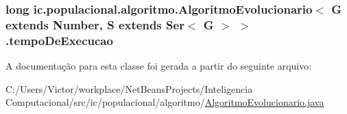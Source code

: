 \hypertarget{classic_1_1populacional_1_1algoritmo_1_1_algoritmo_evolucionario_3_01_g_01extends_01_number_00_0bd52af860edf752f8985460efb0aa102_a8879c2e45d6694781b6b7f8378efaf39}{
\subsubsection[{tempo\-De\-Execucao}]{\setlength{\rightskip}{0pt plus 5cm}long ic.\-populacional.\-algoritmo.\-Algoritmo\-Evolucionario$<$ G extends Number, S extends Ser$<$ G $>$ $>$.tempo\-De\-Execucao\hspace{0.3cm}{\ttfamily [protected]}}}\label{classic_1_1populacional_1_1algoritmo_1_1_algoritmo_evolucionario_3_01_g_01extends_01_number_00_0bd52af860edf752f8985460efb0aa102_a8879c2e45d6694781b6b7f8378efaf39}


A documentação para esta classe foi gerada a partir do seguinte arquivo\-:\begin{DoxyCompactItemize}
\item 
C\-:/\-Users/\-Victor/workplace/\-Net\-Beans\-Projects/\-Inteligencia Computacional/src/ic/populacional/algoritmo/\hyperlink{_algoritmo_evolucionario_8java}{Algoritmo\-Evolucionario.\-java}\end{DoxyCompactItemize}
